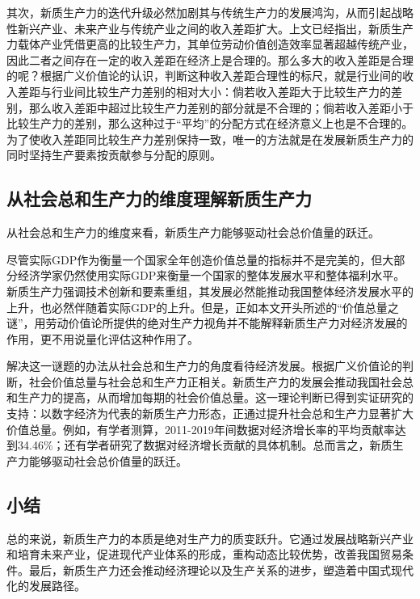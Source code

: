 其次，新质生产力的迭代升级必然加剧其与传统生产力的发展鸿沟\cite[39-40]{ChenZhangHongGuanJingJiBoDongShiZhengFenXiDeYiZhongSiLuShiLunShengChanLiFeiPingHengJieGouYuJingJiBoDong1999}，从而引起战略性新兴产业、未来产业与传统产业之间的收入差距扩大\cite[31]{CaiJiMingXinZhiShengChanLiDeFaZhanDuiJieZhiChuangZaoHeJingJiZengChangDeGongXian2024}。上文已经指出，新质生产力载体产业凭借更高的比较生产力​，其单位劳动价值创造效率显著超越传统产业，因此二者之间存在一定的收入差距在经济上是合理的。那么多大的收入差距是合理的呢？根据广义价值论的认识，判断这种收入差距合理性的标尺，就是行业间的收入差距与行业间比较生产力差别的相对大小：倘若收入差距大于比较生产力的差别，那么收入差距中超过比较生产力差别的部分就是不合理的；倘若收入差距小于比较生产力的差别，那么这种过于“平均”的分配方式在经济意义上也是不合理\cite[69]{CaiJiMingLongDuanHeJingZhengXingYeDeBiJiaoShengChanLiYuShouRuChaiJuJiYuGuangYiJieZhiLunDeFenXi2014}的。为了使收入差距同比较生产力差别保持一致，唯一的方法就是在发展新质生产力的同时坚持生产要素按贡献参与分配的原则\cite[58]{CaiJiMingMaKeSiLaoDongShengChanLiYuJieZhiLiangZhengXiangGuanYuanLiDeKuoZhanJiYingYongJianLunXinZhiShengChanLiDeFaZhanYuWoGuoJiBenJingJiZhiDuDeWanShan2025}。

\subsection{从社会总和生产力的维度理解新质生产力}

从社会总和生产力的维度来看，新质生产力能够驱动社会总价值量的跃迁。

尽管实际GDP作为衡量一个国家全年创造价值总量的指标并不是完美的，但大部分经济学家仍然使用实际GDP来衡量一个国家的整体发展水平和整体福利水平\cite[386]{BaoLuo*SaMouErSenJingJiXueDiShiJiuBan2012}\cite[17-24]{n.GeLiGaoLi*ManKunJingJiXueYuanLiDi7BanHongGuanJingJiFenCe2015}。新质生产力强调技术创新和要素重组，其发展必然能推动我国整体经济发展水平的上升，也必然伴随着实际GDP的上升。但是，正如本文开头所述的“价值总量之谜”，用劳动价值论所提供的绝对生产力视角并不能解释新质生产力对经济发展的作用，更不用说量化评估这种作用了。

解决这一谜题的办法从社会总和生产力的角度看待经济发展。根据广义价值论的判断，社会价值总量与社会总和生产力正相关。新质生产力的发展会推动我国社会总和生产力的提高，从而增加每期的社会价值总量。这一理论判断已得到实证研究的支持：以数字经济为代表的新质生产力形态，正通过提升社会总和生产力显著扩大价值总量。例如，有学者测算，2011-2019年间数据对经济增长率的平均贡献率达到34.46\%\cite[63]{LiuTaoXiongShuJuZiBenGuSuanJiDuiZhongGuoJingJiZengChangDeGongXianJiYuShuJuJieZhiLianDeShiJiao2023}；还有学者研究了数据对经济增长贡献的具体机制\cite{CaiJiMingLunShuJuYaoSuAnGongXianCanYuFenPeiDeJieZhiJiChuJiYuGuangYiJieZhiLunDeShiJiao2023}\cite{RenBaoPingShuZiXinZhiShengChanLiTuiDongJingJiGaoZhiLiangFaZhanDeLuoJiYuLuJing2023}。总而言之，新质生产力能够驱动社会总价值量的跃迁。

\subsection{小结}

总的来说，新质生产力的本质是绝对生产力的质变跃升。它通过发展战略新兴产业和培育未来产业，促进现代产业体系的形成，重构动态比较优势，改善我国贸易条件。最后，新质生产力还会推动经济理论以及生产关系的进步，塑造着中国式现代化的发展路径。